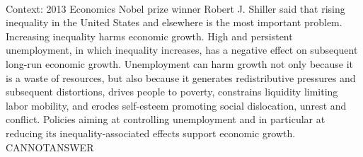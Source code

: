 \documentclass[11pt,a4paper, onecolumn]{article}
\begin{document}
\\ Context: 2013 Economics Nobel prize winner Robert J. Shiller said that rising inequality in the United States and elsewhere is the most important problem. Increasing inequality harms economic growth. High and persistent unemployment, in which inequality increases, has a negative effect on subsequent long-run economic growth. Unemployment can harm growth not only because it is a waste of resources, but also because it generates redistributive pressures and subsequent distortions, drives people to poverty, constrains liquidity limiting labor mobility, and erodes self-esteem promoting social dislocation, unrest and conflict. Policies aiming at controlling unemployment and in particular at reducing its inequality-associated effects support economic growth. CANNOTANSWER
\end{document}
